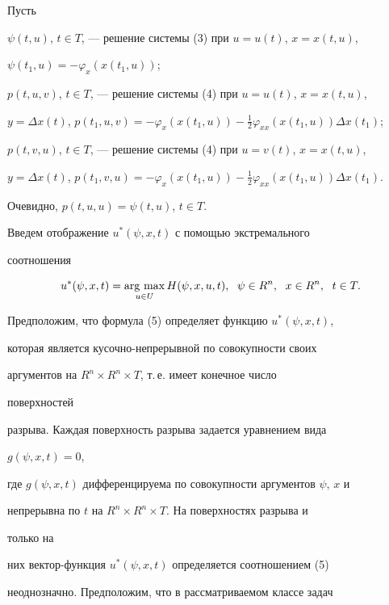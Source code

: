 Пусть


$\psi(t,u)$, $t\in T$, --- решение системы (3) при $u=u(t)$, $x=x(t,u)$, 


$\psi(t_1,u)=-\varphi_x(x(t_1,u))$;


$p(t,u,v)$, $t\in T$, --- решение системы (4) при $u=u(t)$, $x=x(t,u)$, 


$y=\Delta x(t)$, $p(t_1,u,v)=-\varphi_x (x(t_1,u))-\frac{1}{2} 


\varphi_{xx}(x(t_1,u))\Delta x(t_1)$;


$p(t,v,u)$, $t\in T$, --- решение системы (4) при $u=v(t)$, $x=x(t,u)$, 


$y=\Delta x(t)$, $p(t_1,v,u)=-\varphi_x(x(t_1,u))-\frac{1}{2} 


\varphi_{xx}(x(t_1,u))\Delta x(t_1)$.


Очевидно, $p(t,u,u)=\psi(t,u)$, $t\in T$.





Введем отображение $u^*(\psi,x,t)$ с помощью экстремального 


соотношения


\begin{equation}


u^*(\psi,x,t)=\argmax_{u\in U} H(\psi,x,u,t),\ \;


\psi\in R^n,\ \; x\in R^n, \ \; t\in T.


\end{equation}





Предположим, что формула (5) определяет функцию $u^*(\psi,x,t)$,


которая является кусочно-непрерывной по совокупности своих


аргументов на $R^n\times R^n\times T$, т.\,е. имеет конечное число 


поверхностей 


разрыва. Каждая поверхность разрыва задается уравнением вида 


$g(\psi,x,t)=0$,


где $g(\psi,x,t)$ дифференцируема по совокупности аргументов $\psi$, $x$ и 


непрерывна по $t$ на $R^n\times R^n\times T$. На поверхностях разрыва и 


только на 


них вектор-функция $u^*(\psi,x,t)$ определяется соотношением (5) 


неоднозначно. Предположим, что в рассматриваемом классе задач 


